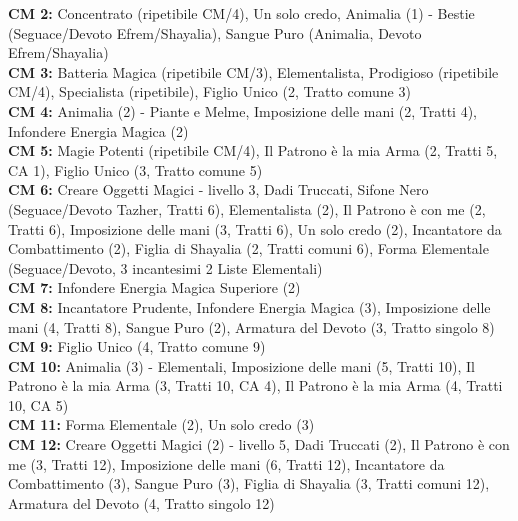\begin{multicols}{2}
	\textbf{CM 2:} Concentrato (ripetibile CM/4), Un solo credo, Animalia (1) - Bestie (Seguace/Devoto Efrem/Shayalia), Sangue Puro (Animalia, Devoto Efrem/Shayalia)\\

	\textbf{CM 3:} Batteria Magica (ripetibile CM/3), Elementalista, Prodigioso (ripetibile CM/4), Specialista (ripetibile), Figlio Unico (2, Tratto comune 3)\\

	\textbf{CM 4:} Animalia (2) - Piante e Melme, Imposizione delle mani (2, Tratti 4), Infondere Energia Magica (2)\\

	\textbf{CM 5:} Magie Potenti (ripetibile CM/4), Il Patrono è la mia Arma (2, Tratti 5, CA 1), Figlio Unico (3, Tratto comune 5)\\

	\textbf{CM 6:} Creare Oggetti Magici - livello 3, Dadi Truccati, Sifone Nero (Seguace/Devoto Tazher, Tratti 6), Elementalista (2), Il Patrono è con me (2, Tratti 6), Imposizione delle mani (3, Tratti 6), Un solo credo (2), Incantatore da Combattimento (2), Figlia di Shayalia (2, Tratti comuni 6), Forma Elementale (Seguace/Devoto, 3 incantesimi 2 Liste Elementali)\\

	\textbf{CM 7:} Infondere Energia Magica Superiore (2)\\

	\textbf{CM 8:} Incantatore Prudente, Infondere Energia Magica (3), Imposizione delle mani (4, Tratti 8), Sangue Puro (2), Armatura del Devoto (3, Tratto singolo 8)\\

	\textbf{CM 9:} Figlio Unico (4, Tratto comune 9)\\

	\textbf{CM 10:} Animalia (3) - Elementali, Imposizione delle mani (5, Tratti 10), Il Patrono è la mia Arma (3, Tratti 10, CA 4), Il Patrono è la mia Arma (4, Tratti 10, CA 5)\\

	\textbf{CM 11:} Forma Elementale (2), Un solo credo (3)\\

	\textbf{CM 12:} Creare Oggetti Magici (2) - livello 5, Dadi Truccati (2), Il Patrono è con me (3, Tratti 12), Imposizione delle mani (6, Tratti 12), Incantatore da Combattimento (3), Sangue Puro (3), Figlia di Shayalia (3, Tratti comuni 12), Armatura del Devoto (4, Tratto singolo 12)\\


\end{multicols}
